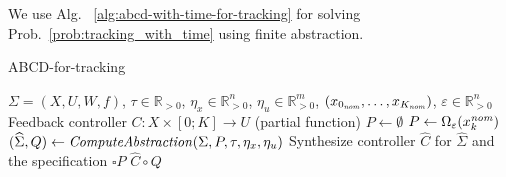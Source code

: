 We use Alg.~ \ref{alg:abcd-with-time-for-tracking} for solving Prob.~\ref{prob:tracking_with_time} using finite abstraction.




\begin{algorithm}
	\caption{ABCD-for-tracking}
	\label{alg:abcd-with-time-for-tracking}
	\begin{algorithmic}[1]
		\Require $\Sigma=(X,U,W,f)$, $\tau \in \mathbb{R}_{>0}$, $\eta_x\in \mathbb{R}^n_{>0}$, $\eta_u\in \mathbb{R}^m_{>0}$, $(x_{0_{\mathit{nom}}},\ldots,x_{K_{\mathit{nom}}})$, $\varepsilon \in \mathbb{R}_{>0}^{n}$
		\Ensure Feedback controller $C\colon X\times [0;K]\to U$ (partial function)
		\State $P \gets \emptyset$
		\State $P \gets \Omega_{\varepsilon}(x_k^{\mathit{nom}})$
		\EndFor
		\State $(\widehat{\Sigma},Q) \gets \mathit{ComputeAbstraction}(\Sigma, P, \tau, \eta_{x} , \eta_u)$
		\State Synthesize controller $\widehat{C}$ for $\widehat{\Sigma}$ and the specification $\square P$ %
		\State \Return $\widehat{C}\circ Q$
	\end{algorithmic}
\end{algorithm}

